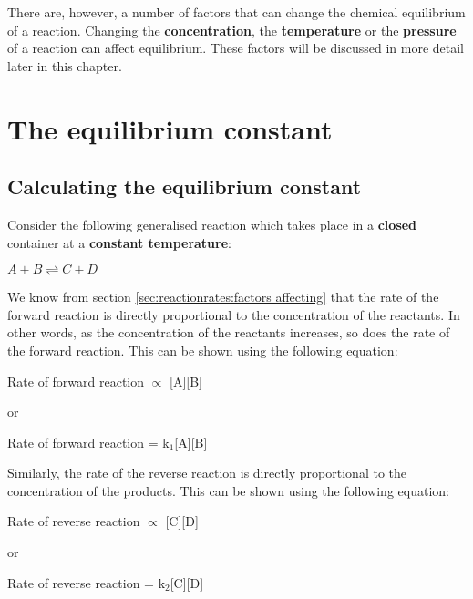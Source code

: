There are, however, a number of factors that can change the chemical equilibrium of a reaction. Changing the \textbf{concentration}, the \textbf{temperature} or the \textbf{pressure} of a reaction can affect equilibrium. These factors will be discussed in more detail later in this chapter.







\section{The equilibrium constant}


\subsection{Calculating the equilibrium constant}

Consider the following generalised reaction which takes place in a \textbf{closed} container at a \textbf{constant temperature}:
\begin{center}
\rm${A + B \rightleftharpoons C + D}$ 
\end{center}

We know from section \ref{sec:reactionrates:factors affecting} that the rate of the forward reaction is directly proportional to the concentration of the reactants. In other words, as the concentration of the reactants increases, so does the rate of the forward reaction. This can be shown using the following equation:
\begin{center}
Rate of forward reaction $\propto$ [A][B] 

or

Rate of forward reaction = k$_{1}$[A][B]
\end{center}

Similarly, the rate of the reverse reaction is directly proportional to the concentration of the products. This can be shown using the following equation:
\begin{center}
Rate of reverse reaction $\propto$ [C][D]

or

Rate of reverse reaction = k$_{2}$[C][D]
\end{center}

